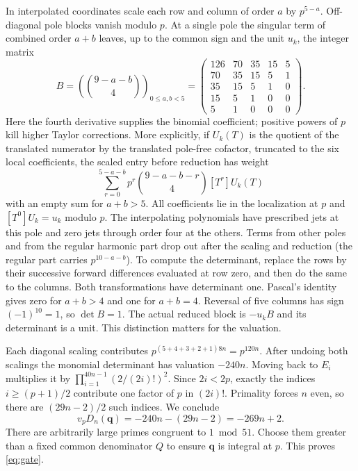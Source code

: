 \documentclass[11pt]{article}
\newcommand{\val}{v_p}
\begin{document}
In interpolated coordinates scale each row and column of order $a$ by
$p^{5-a}$. Off-diagonal pole blocks vanish modulo $p$. At a single
pole the singular term of combined order $a+b$ leaves, up to the common
sign and the unit $u_k$, the integer matrix
\[
 B=\left(\binom{9-a-b}{4}\right)_{0\le a,b<5}
 =\begin{pmatrix}126&70&35&15&5\\70&35&15&5&1\\35&15&5&1&0\\
 15&5&1&0&0\\5&1&0&0&0\end{pmatrix}.
\]
Here the fourth derivative supplies the binomial coefficient; positive
powers of $p$ kill higher Taylor corrections. More explicitly, if
$U_k(T)$ is the quotient of the translated numerator by the translated
pole-free cofactor, truncated to the six local coefficients, the scaled
entry before reduction has weight
\[
 \sum_{r=0}^{5-a-b}p^r\binom{9-a-b-r}{4}[T^r]U_k(T)
\]
with an empty sum for $a+b>5$. All coefficients lie in the localization
at $p$ and $[T^0]U_k=u_k$ modulo $p$. The interpolating polynomials
have prescribed jets at this pole and zero jets through order four at
the others. Terms from other poles and from the regular harmonic part
drop out after the scaling and reduction (the regular part carries
$p^{10-a-b}$). To compute the determinant,
replace the rows by their successive forward differences evaluated at row
zero, and then do the same to the columns. Both transformations have
determinant one. Pascal's identity gives zero for $a+b>4$ and one for
$a+b=4$. Reversal of five columns has sign $(-1)^{10}=1$, so $\det B=1$.
The actual reduced block is $-u_k B$ and its determinant is a unit.
This distinction matters for the valuation.

Each diagonal scaling contributes $p^{(5+4+3+2+1)8n}=p^{120n}$.
After undoing both scalings the monomial determinant has valuation
$-240n$. Moving back to $E_i$ multiplies it by
$\prod_{i=1}^{40n-1}(2/(2i)!)^2$. Since $2i<2p$, exactly the indices
$i\ge(p+1)/2$ contribute one factor of $p$ in $(2i)!$.
Primality forces $n$ even, so there are $(29n-2)/2$ such indices.
We conclude
\[
 \val D_n(\mathbf q)=-240n-(29n-2)=-269n+2 .
\]
There are arbitrarily large primes congruent to $1\bmod 51$.
Choose them greater than a fixed common denominator $Q$ to ensure
$\mathbf q$ is integral at $p$. This proves \eqref{eq:gate}.
\end{document}
